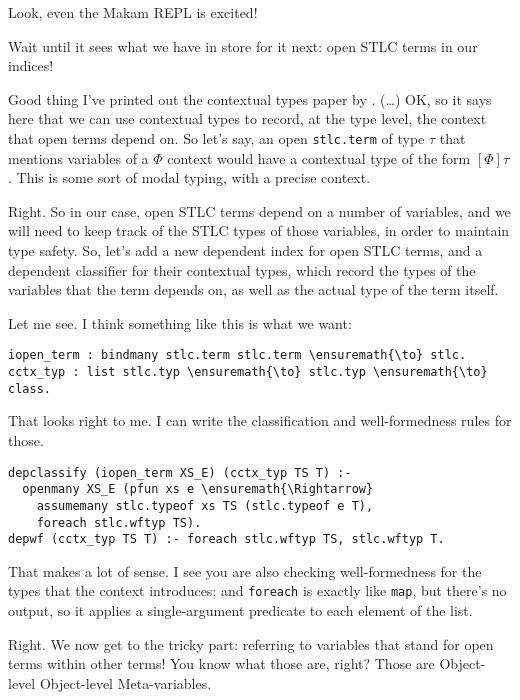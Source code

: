 \heroSTUDENT{} Look, even the Makam REPL is excited!

\heroADVISOR{} Wait until it sees what we have in store for it next: open STLC
terms in our indices!

\heroSTUDENT{} Good thing I've printed out the contextual types paper by
\citet{nanevski2008contextual}. (\ldots{}) OK, so it says here that we
can use contextual types to record, at the type level, the context that
open terms depend on. So let's say, an open \texttt{stlc.term} of type
\(\tau\) that mentions variables of a \(\Phi\) context would have a
contextual type of the form \([\Phi] \tau\). This is some sort of modal
typing, with a precise context.

\heroADVISOR{} Right. So in our case, open STLC terms depend on a number of
variables, and we will need to keep track of the STLC types of those
variables, in order to maintain type safety. So, let's add a new
dependent index for open STLC terms, and a dependent classifier for
their contextual types, which record the types of the variables that the
term depends on, as well as the actual type of the term itself.

\heroSTUDENT{} Let me see. I think something like this is what we want:

\begin{verbatim}
iopen_term : bindmany stlc.term stlc.term \ensuremath{\to} stlc.
cctx_typ : list stlc.typ \ensuremath{\to} stlc.typ \ensuremath{\to} class.
\end{verbatim}

\heroADVISOR{} That looks right to me. I can write the classification and
well-formedness rules for those.

\begin{verbatim}
depclassify (iopen_term XS_E) (cctx_typ TS T) :-
  openmany XS_E (pfun xs e \ensuremath{\Rightarrow}
    assumemany stlc.typeof xs TS (stlc.typeof e T),
    foreach stlc.wftyp TS).
depwf (cctx_typ TS T) :- foreach stlc.wftyp TS, stlc.wftyp T.
\end{verbatim}

\heroSTUDENT{} That makes a lot of sense. I see you are also checking
well-formedness for the types that the context introduces; and
\texttt{foreach} is exactly like \texttt{map}, but there's no output, so
it applies a single-argument predicate to each element of the list.

\heroADVISOR{} Right. We now get to the tricky part: referring to variables
that stand for open terms within other terms! You know what those are,
right? Those are Object-level Object-level Meta-variables.

